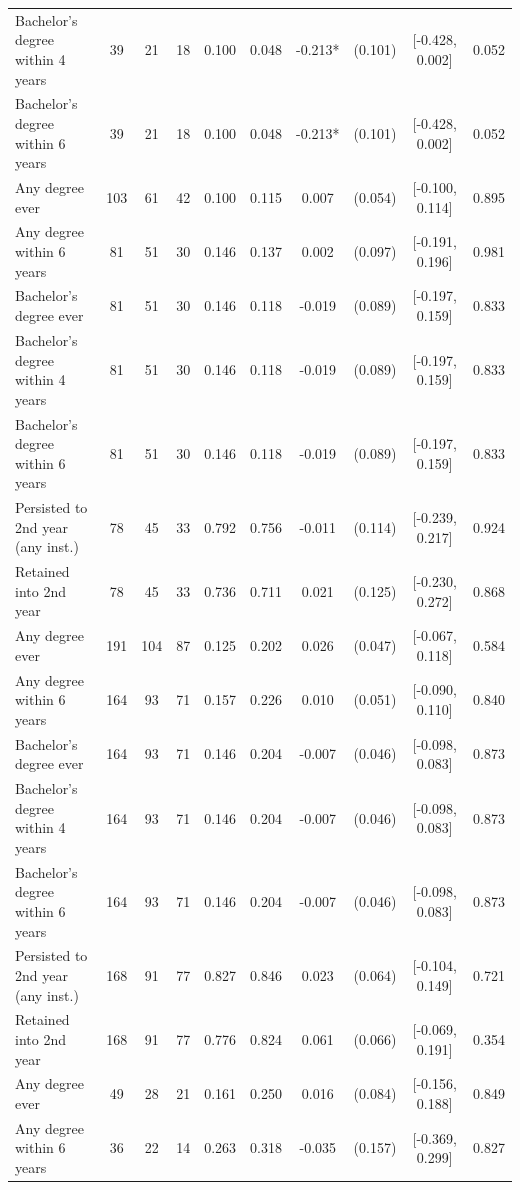 \begin{table}[t]
\begin{tabular*}{\linewidth}{@{\extracolsep{\fill}}l|ccccccccc}
Bachelor's degree within 4 years & 39 & 21 & 18 & 0.100 & 0.048 & -0.213* & (0.101) & [-0.428, 0.002] & 0.052 \\ 
Bachelor's degree within 6 years & 39 & 21 & 18 & 0.100 & 0.048 & -0.213* & (0.101) & [-0.428, 0.002] & 0.052 \\ 
Any degree ever & 103 & 61 & 42 & 0.100 & 0.115 & 0.007 & (0.054) & [-0.100, 0.114] & 0.895 \\ 
Any degree within 6 years & 81 & 51 & 30 & 0.146 & 0.137 & 0.002 & (0.097) & [-0.191, 0.196] & 0.981 \\ 
Bachelor's degree ever & 81 & 51 & 30 & 0.146 & 0.118 & -0.019 & (0.089) & [-0.197, 0.159] & 0.833 \\ 
Bachelor's degree within 4 years & 81 & 51 & 30 & 0.146 & 0.118 & -0.019 & (0.089) & [-0.197, 0.159] & 0.833 \\ 
Bachelor's degree within 6 years & 81 & 51 & 30 & 0.146 & 0.118 & -0.019 & (0.089) & [-0.197, 0.159] & 0.833 \\ 
Persisted to 2nd year (any inst.) & 78 & 45 & 33 & 0.792 & 0.756 & -0.011 & (0.114) & [-0.239, 0.217] & 0.924 \\ 
Retained into 2nd year & 78 & 45 & 33 & 0.736 & 0.711 & 0.021 & (0.125) & [-0.230, 0.272] & 0.868 \\ 
Any degree ever & 191 & 104 & 87 & 0.125 & 0.202 & 0.026 & (0.047) & [-0.067, 0.118] & 0.584 \\ 
Any degree within 6 years & 164 & 93 & 71 & 0.157 & 0.226 & 0.010 & (0.051) & [-0.090, 0.110] & 0.840 \\ 
Bachelor's degree ever & 164 & 93 & 71 & 0.146 & 0.204 & -0.007 & (0.046) & [-0.098, 0.083] & 0.873 \\ 
Bachelor's degree within 4 years & 164 & 93 & 71 & 0.146 & 0.204 & -0.007 & (0.046) & [-0.098, 0.083] & 0.873 \\ 
Bachelor's degree within 6 years & 164 & 93 & 71 & 0.146 & 0.204 & -0.007 & (0.046) & [-0.098, 0.083] & 0.873 \\ 
Persisted to 2nd year (any inst.) & 168 & 91 & 77 & 0.827 & 0.846 & 0.023 & (0.064) & [-0.104, 0.149] & 0.721 \\ 
Retained into 2nd year & 168 & 91 & 77 & 0.776 & 0.824 & 0.061 & (0.066) & [-0.069, 0.191] & 0.354 \\ 
Any degree ever & 49 & 28 & 21 & 0.161 & 0.250 & 0.016 & (0.084) & [-0.156, 0.188] & 0.849 \\ 
Any degree within 6 years & 36 & 22 & 14 & 0.263 & 0.318 & -0.035 & (0.157) & [-0.369, 0.299] & 0.827 \\ 

\end{tabular*}
\end{table}
